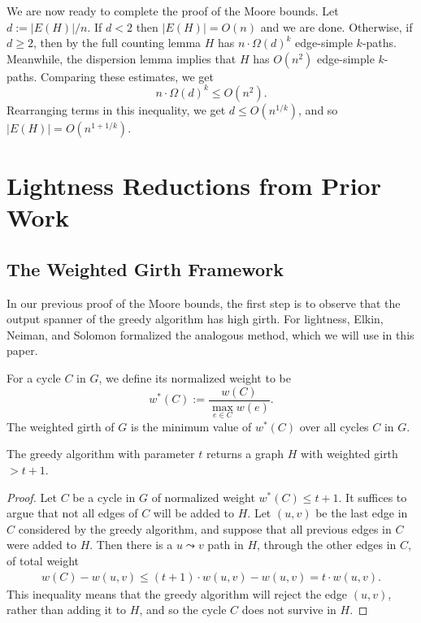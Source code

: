 \documentclass{article}\usepackage[a4paper,margin=20mm]{geometry}
\begin{document}
We are now ready to complete the proof of the Moore bounds.
Let $d := |E(H)|/n$.
If $d < 2$ then $|E(H)| = O(n)$ and we are done.
Otherwise, if $d \ge 2$, then by the full counting lemma $H$ has $n \cdot \Omega(d)^k$ edge-simple $k$-paths.
Meanwhile, the dispersion lemma implies that $H$ has $O(n^2)$ edge-simple $k$-paths.
Comparing these estimates, we get
$$n \cdot \Omega(d)^k \le O(n^2).$$
Rearranging terms in this inequality, we get
$d \le O(n^{1/k})$,
and so $|E(H)| = O(n^{1+1/k})$.


\section{Lightness Reductions from Prior Work \label{sec:priorwork}}

\subsection{The Weighted Girth Framework \label{sec:wtgirth}}

In our previous proof of the Moore bounds, the first step is to observe that the output spanner of the greedy algorithm has high girth.
For lightness, Elkin, Neiman, and Solomon \cite{ENS15} formalized the analogous method, which we will use in this paper.

\begin{definition} 
For a cycle $C$ in $G$, we define its normalized weight to be
$$w^*(C) := \frac{w(C)}{\max_{e \in C} w(e)}.$$
The weighted girth of $G$ is the minimum value of $w^*(C)$ over all cycles $C$ in $G$.
\end{definition}

\begin{lemma}  \label{lem:wtgirth}
The greedy algorithm with parameter $t$ returns a graph $H$ with weighted girth $>t+1$.
\end{lemma}
\begin{proof}
Let $C$ be a cycle in $G$ of normalized weight $w^*(C) \le t+1$.
It suffices to argue that not all edges of $C$ will be added to $H$.
Let $(u, v)$ be the last edge in $C$ considered by the greedy algorithm, and suppose that all previous edges in $C$ were added to $H$.
Then there is a $u \leadsto v$ path in $H$, through the other edges in $C$, of total weight
\begin{align*}
w(C) - w(u, v) \le (t+1) \cdot w(u, v) - w(u, v) = t \cdot w(u, v).
\end{align*}
This inequality means that the greedy algorithm will reject the edge $(u, v)$, rather than adding it to $H$, and so the cycle $C$ does not survive in $H$.
\end{proof}
\end{document}
